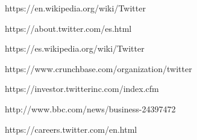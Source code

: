 \documentclass[12pt, spanish]{article}
\begin{document}
\newpage






https://en.wikipedia.org/wiki/Twitter 

https://about.twitter.com/es.html

https://es.wikipedia.org/wiki/Twitter

https://www.crunchbase.com/organization/twitter

https://investor.twitterinc.com/index.cfm

http://www.bbc.com/news/business-24397472

https://careers.twitter.com/en.html
\end{document}
